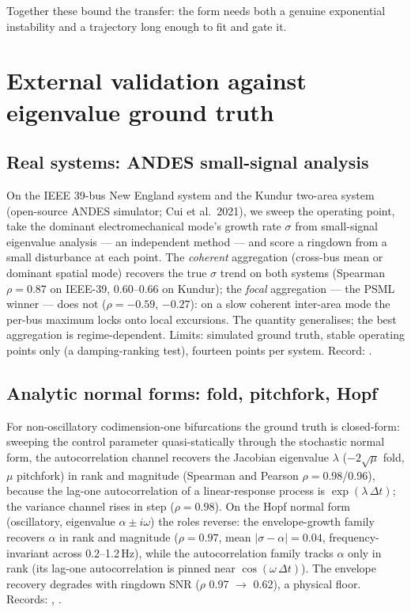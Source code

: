 \documentclass[aip,cha,preprint,amsmath,amssymb]{revtex4-2}
\begin{document}
Together these bound the transfer: the form needs both a genuine
exponential instability and a trajectory long enough to fit and gate
it.

\section{External validation against eigenvalue ground truth}\label{sec:external}

\subsection{Real systems: ANDES small-signal analysis}\label{sec:andes}

On the IEEE 39-bus New England system and the Kundur two-area system
(open-source ANDES simulator; Cui et al.\ 2021), we sweep the operating
point, take the dominant electromechanical mode's growth rate $\sigma$
from small-signal eigenvalue analysis --- an independent method --- and
score a ringdown from a small disturbance at each point. The
\emph{coherent} aggregation (cross-bus mean or dominant spatial mode)
recovers the true $\sigma$ trend on both systems (Spearman
$\rho = 0.87$ on IEEE-39, 0.60--0.66 on Kundur); the \emph{focal}
aggregation --- the PSML winner --- does not ($\rho = -0.59$, $-0.27$):
on a slow coherent inter-area mode the per-bus maximum locks onto local
excursions. The quantity generalises; the best aggregation is
regime-dependent. Limits: simulated ground truth, stable operating
points only (a damping-ranking test), fourteen points per system.
Record:
.

\subsection{Analytic normal forms: fold, pitchfork, Hopf}\label{sec:normalforms}

For non-oscillatory codimension-one bifurcations the ground truth is
closed-form: sweeping the control parameter quasi-statically through
the stochastic normal form, the autocorrelation channel recovers the
Jacobian eigenvalue $\lambda$ ($-2\sqrt{\mu}$ fold, $\mu$ pitchfork)
in rank and magnitude (Spearman and Pearson $\rho = 0.98$/0.96),
because the lag-one autocorrelation of a linear-response process is
$\exp(\lambda\,\Delta t)$; the variance channel rises in step
($\rho = 0.98$). On the Hopf normal form (oscillatory, eigenvalue
$\alpha \pm i\omega$) the roles reverse: the envelope-growth family
recovers $\alpha$ in rank and magnitude ($\rho = 0.97$, mean
$|\sigma - \alpha| = 0.04$, frequency-invariant across 0.2--1.2\,Hz),
while the autocorrelation family tracks $\alpha$ only in rank (its
lag-one autocorrelation is pinned near $\cos(\omega\,\Delta t)$). The
envelope recovery degrades with ringdown SNR ($\rho$ 0.97 $\to$ 0.62),
a physical floor. Records:
,
.
\end{document}
